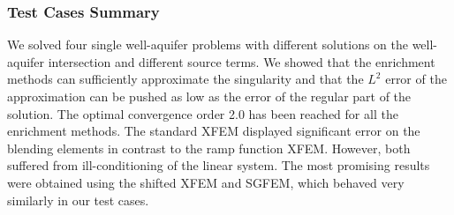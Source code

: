 
\subsubsection{Test Cases Summary}
We solved four single well-aquifer problems with different solutions on the well-aquifer intersection and different source terms.
We showed that the enrichment methods can sufficiently approximate the singularity and that the $L^2$ error of the approximation
can be pushed as low as the error of the regular part of the solution. The optimal convergence order 2.0 has been reached for all
the enrichment methods. The standard XFEM displayed significant error on the blending elements in contrast to the ramp function XFEM.
However, both suffered from ill-conditioning of the linear system. The most promising results were obtained using the shifted XFEM
and SGFEM, which behaved very similarly in our test cases.

